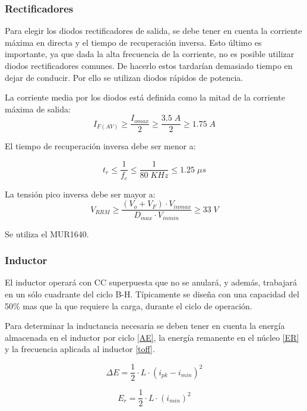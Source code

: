 \documentclass[11pt, a4paper]{article}
\begin{document}
\subsubsection{Rectificadores}
Para elegir los diodos rectificadores de salida, se debe tener en cuenta la corriente máxima en directa y el tiempo de recuperación inversa. Esto último es importante, ya que dada la alta frecuencia de la corriente, no es posible utilizar diodos rectificadores comunes. De hacerlo estos tardarían demasiado tiempo en dejar de conducir. Por ello se utilizan diodos rápidos de potencia.

La corriente media por los diodos está definida como la mitad de la corriente máxima de salida:
\begin{equation}
I_{F(AV)} \geq \frac{I_{omax}}{2} \geq \frac{3.5 \; A}{2} \geq 1.75 \; A
\end{equation}

El tiempo de recuperación inversa debe ser menor a:

\begin{equation}
t_r \leq \frac{1}{f_c} \leq \frac{1}{80 \; KHz} \leq 1.25 \; \mu s
\end{equation}

La tensión pico inversa debe ser mayor a:
\begin{equation}
V_{RRM} \geq \frac{(V_o + V_F) \cdot V_{inmax} }{D_{max} \cdot V_{inmin}} \geq 33 \; V
\label{VRDO}
\end{equation}

Se utiliza el MUR1640.

\subsubsection{Inductor}
El inductor operará con CC superpuesta que no se anulará, y además, trabajará en un sólo cuadrante del ciclo B-H. Típicamente se diseña con una capacidad del 50\% mas que la que requiere la carga, durante el ciclo de operación.

Para determinar la inductancia necesaria se deben tener en cuenta la energía almacenada en el inductor por ciclo \ref{AE}, la energía remanente en el núcleo \ref{ER} y la frecuencia aplicada al inductor \ref{toff}.

\begin{equation}
\Delta E = \frac{1}{2} \cdot L \cdot (i_{pk} - i_{min})^2 
\label{AE}
\end{equation}

\begin{equation}
E_r = \frac{1}{2} \cdot L \cdot (i_{min})^2 
\label{ER}
\end{equation}
\end{document}
